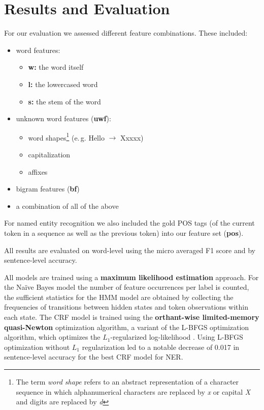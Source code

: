 \documentclass[twocolumns]{IEEEtran}
\begin{document}
\section{Results and Evaluation}

For our evaluation we assessed different feature combinations. These included:

\vspace*{2mm}
\begin{itemize}
    \item word features:
    \begin{itemize}
        \item \textbf{w:} the word itself
        \item \textbf{l:} the lowercased word
        \item \textbf{s:} the stem of the word
    \end{itemize}
    \item unknown word features (\textbf{uwf}):
    \begin{itemize}
        \item word shapes\footnote{The term \textit{word shape} refers to an abstract representation of a character sequence in which alphanumerical characters are replaced by \textit{x} or capital \textit{X} and digits are replaced by \textit{d}} (e.\,g. Hello $\longrightarrow$ Xxxxx)
        \item capitalization
        \item affixes
    \end{itemize}
    \item bigram features (\textbf{bf})
    \item a combination of all of the above
\end{itemize}
\vspace*{2mm}

For named entity recognition we also included the gold POS tags (of the current token in a sequence as well as the previous token) into our feature set (\textbf{pos}).

All results are evaluated on word-level using the micro averaged F1 score and by sentence-level accuracy.

All models are trained using a \textbf{maximum likelihood estimation} approach. For the Na\"ive Bayes model the number of feature occurrences per label is counted, the sufficient statistics for the HMM model are obtained by collecting the frequencies of transitions between hidden states and token observations within each state.
The CRF model is trained using the \textbf{orthant-wise limited-memory quasi-Newton} optimization algorithm, a variant of the L-BFGS optimization algorithm, which optimizes the $L_1$-regularized log-likelihood \cite{owlqn}. Using L-BFGS optimization without $L_1$ regularization led to a notable decrease of 0.017 in sentence-level accuracy for the best CRF model for NER.
\end{document}
